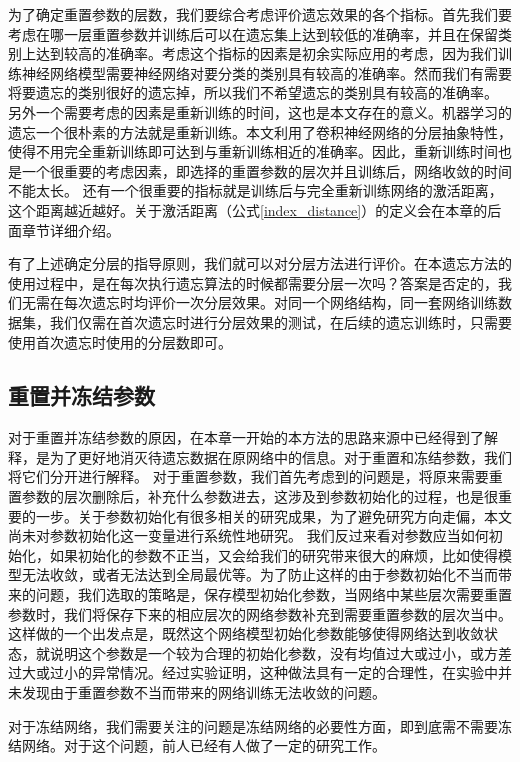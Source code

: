 为了确定重置参数的层数，我们要综合考虑评价遗忘效果的各个指标。首先我们要考虑在哪一层重置参数并训练后可以在遗忘集上达到较低的准确率，并且在保留类别上达到较高的准确率。考虑这个指标的因素是初余实际应用的考虑，因为我们训练神经网络模型需要神经网络对要分类的类别具有较高的准确率。然而我们有需要将要遗忘的类别很好的遗忘掉，所以我们不希望遗忘的类别具有较高的准确率。
另外一个需要考虑的因素是重新训练的时间，这也是本文存在的意义。机器学习的遗忘一个很朴素的方法就是重新训练。本文利用了卷积神经网络的分层抽象特性，使得不用完全重新训练即可达到与重新训练相近的准确率。因此，重新训练时间也是一个很重要的考虑因素，即选择的重置参数的层次并且训练后，网络收敛的时间不能太长。
还有一个很重要的指标就是训练后与完全重新训练网络的激活距离，这个距离越近越好。关于激活距离（公式\ref{index_distance}）的定义会在本章的后面章节详细介绍。

有了上述确定分层的指导原则，我们就可以对分层方法进行评价。在本遗忘方法的使用过程中，是在每次执行遗忘算法的时候都需要分层一次吗？答案是否定的，我们无需在每次遗忘时均评价一次分层效果。对同一个网络结构，同一套网络训练数据集，我们仅需在首次遗忘时进行分层效果的测试，在后续的遗忘训练时，只需要使用首次遗忘时使用的分层数即可。

\subsection{重置并冻结参数}

对于重置并冻结参数的原因，在本章一开始的本方法的思路来源中已经得到了解释，是为了更好地消灭待遗忘数据在原网络中的信息。对于重置和冻结参数，我们将它们分开进行解释。
对于重置参数，我们首先考虑到的问题是，将原来需要重置参数的层次删除后，补充什么参数进去，这涉及到参数初始化的过程，也是很重要的一步。关于参数初始化有很多相关的研究成果，为了避免研究方向走偏，本文尚未对参数初始化这一变量进行系统性地研究。
我们反过来看对参数应当如何初始化，如果初始化的参数不正当，又会给我们的研究带来很大的麻烦，比如使得模型无法收敛，或者无法达到全局最优等。为了防止这样的由于参数初始化不当而带来的问题，我们选取的策略是，保存模型初始化参数，当网络中某些层次需要重置参数时，我们将保存下来的相应层次的网络参数补充到需要重置参数的层次当中。这样做的一个出发点是，既然这个网络模型初始化参数能够使得网络达到收敛状态，就说明这个参数是一个较为合理的初始化参数，没有均值过大或过小，或方差过大或过小的异常情况。经过实验证明，这种做法具有一定的合理性，在实验中并未发现由于重置参数不当而带来的网络训练无法收敛的问题。

对于冻结网络，我们需要关注的问题是冻结网络的必要性方面，即到底需不需要冻结网络。对于这个问题，前人已经有人做了一定的研究工作。

